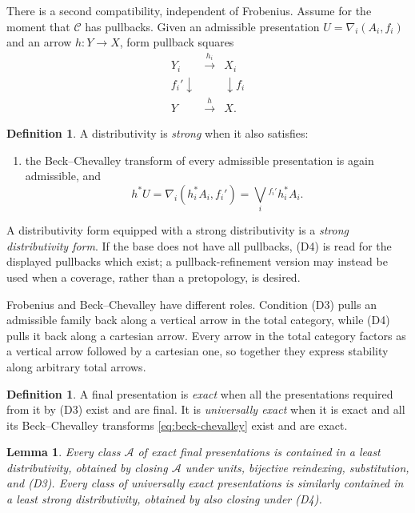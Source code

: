 \documentclass[12pt,oneside,reqno]{amsart}
\newtheorem{lemma}[theorem]{Lemma}
\theoremstyle{definition}
\newtheorem{definition}[theorem]{Definition}
\theoremstyle{remark}
\newcommand{\C}{\mathcal C}
\begin{document}
There is a second compatibility, independent of Frobenius.  Assume for
the moment that \(\C\) has pullbacks.  Given an admissible presentation
\(U=\nabla_i(A_i,f_i)\) and an arrow \(h:Y\to X\), form pullback squares
\[
\begin{array}{ccc}
Y_i&\xrightarrow{\ h_i\ }&X_i\\[-2pt]
{\scriptstyle f_i'}\!\downarrow&&\downarrow\!{\scriptstyle f_i}\\[-2pt]
Y&\xrightarrow{\ h\ }&X .
\end{array}
\]

\begin{definition}\label{def:strong-distributivity}
A distributivity is \emph{strong} when it also satisfies:
\begin{enumerate}[label=\textup{(D4)},leftmargin=4.2em]
\item the Beck--Chevalley transform of every admissible presentation is
again admissible, and
\begin{equation}\label{eq:beck-chevalley}
 h^*U=\nabla_i(h_i^*A_i,f_i')
       =\bigvee_i{}^{f_i'}h_i^*A_i.
\end{equation}
\end{enumerate}
A distributivity form equipped with a strong distributivity is a
\emph{strong distributivity form}.  If the base does not have all
pullbacks, (D4) is read for the displayed pullbacks which exist; a
pullback-refinement version may instead be used when a coverage, rather
than a pretopology, is desired.
\end{definition}

Frobenius and Beck--Chevalley have different roles.  Condition (D3)
pulls an admissible family back along a vertical arrow in the total
category, while (D4) pulls it back along a cartesian arrow.  Every arrow
in the total category factors as a vertical arrow followed by a
cartesian one, so together they express stability along arbitrary total
arrows.

\begin{definition}\label{def:exact-presentation}
A final presentation is \emph{exact} when all the presentations required
from it by (D3) exist and are final.  It is \emph{universally exact} when
it is exact and all its Beck--Chevalley transforms
\eqref{eq:beck-chevalley} exist and are exact.
\end{definition}

\begin{lemma}\label{lem:generated-distributivity}
Every class \(\mathcal A\) of exact final presentations is contained in
a least distributivity, obtained by closing \(\mathcal A\) under units,
bijective reindexing, substitution, and (D3).  Every class of universally
exact presentations is similarly contained in a least strong
distributivity, obtained by also closing under (D4).
\end{lemma}
\end{document}
